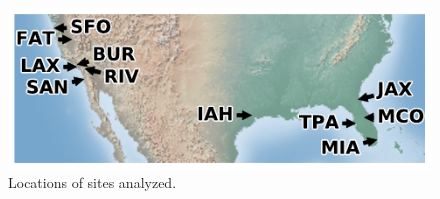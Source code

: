 \documentclass[10pt,a4paper,twocolumn]{article}
\begin{document}
% 
% 

\begin{figure}[htb!]
\centering
\includegraphics{figs/sitemap.pdf}
\caption{\label{fig:sitemap}Locations of sites analyzed.}
\end{figure}
\end{document}

